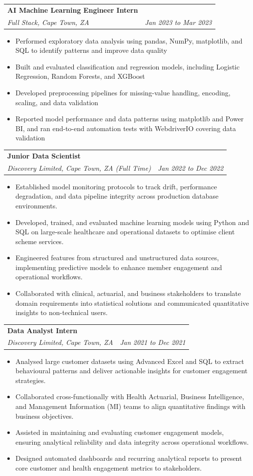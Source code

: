 \documentclass[letterpaper,11pt]{article}
\makeatletter
\newcommand{\resumeItem}[1]{
  \item\small{
    {#1 \vspace{-1pt}}
  }
}
\newcommand{\resumeSubheading}[4]{
  \vspace{-2pt}\item
    \begin{tabular*}{1.0\textwidth}[t]{l@{\extracolsep{\fill}}r}
      \textbf{\large#1} & \textbf{\small #2} \\
      \textit{\large#3} & \textit{\small #4} \\

    \end{tabular*}\vspace{-7pt}
}
\newcommand{\resumeItemListStart}{\begin{itemize}[leftmargin=0.1in]}
\newcommand{\resumeItemListEnd}{\end{itemize}\vspace{-5pt}}
\makeatother
\begin{document}
    \resumeSubheading
      {AI Machine Learning Engineer Intern}{}
      {Full Stack, Cape Town, ZA}{Jan 2023 to Mar 2023}
      \resumeItemListStart
            \resumeItem{\normalsize{Performed exploratory data analysis using pandas, NumPy, matplotlib, and SQL to identify patterns and improve data quality}}
            \resumeItem{\normalsize{Built and evaluated classification and regression models, including Logistic Regression, Random Forests, and XGBoost}}
            \resumeItem{\normalsize{Developed preprocessing pipelines for missing-value handling, encoding, scaling, and data validation}}
            \resumeItem{\normalsize{Reported model performance and data patterns using matplotlib and Power BI, and ran end-to-end automation tests with WebdriverIO covering data validation}}
      \resumeItemListEnd
      \vspace{7pt}
\resumeSubheading
  {Junior Data Scientist}{}
  {Discovery Limited, Cape Town, ZA (Full Time)}{Jan 2022 to Dec 2022}
  \resumeItemListStart
    \resumeItem{Established model monitoring protocols to track drift, performance degradation, and data pipeline integrity across production database environments.}
    \resumeItem{Developed, trained, and evaluated machine learning models using Python and SQL on large-scale healthcare and operational datasets to optimise client scheme services.}
    \resumeItem{Engineered features from structured and unstructured data sources, implementing predictive models to enhance member engagement and operational workflows.}
    \resumeItem{Collaborated with clinical, actuarial, and business stakeholders to translate domain requirements into statistical solutions and communicated quantitative insights to non-technical users.}
  \resumeItemListEnd
\resumeSubheading
  {Data Analyst Intern}{}
  {Discovery Limited, Cape Town, ZA}{Jan 2021 to Dec 2021}
  \resumeItemListStart
    \resumeItem{Analysed large customer datasets using Advanced Excel and SQL to extract behavioural patterns and deliver actionable insights for customer engagement strategies.}
    \resumeItem{Collaborated cross-functionally with Health Actuarial, Business Intelligence, and Management Information (MI) teams to align quantitative findings with business objectives.}
    \resumeItem{Assisted in maintaining and evaluating customer engagement models, ensuring analytical reliability and data integrity across operational workflows.}
    \resumeItem{Designed automated dashboards and recurring analytical reports to present core customer and health engagement metrics to stakeholders.}
  \resumeItemListEnd
\end{document}
